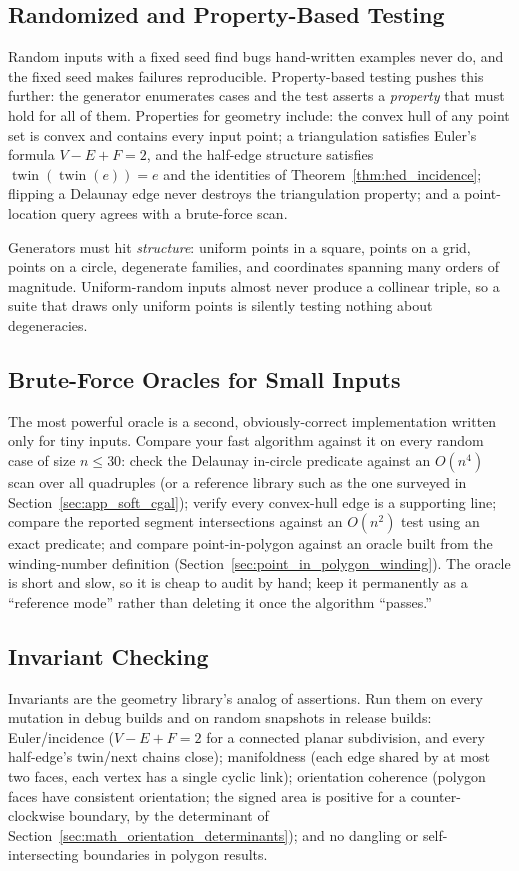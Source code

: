 \subsection{Randomized and Property-Based Testing}
\label{sec:appimpl_randomized}
Random inputs with a fixed seed find bugs
hand-written examples never do, and the fixed seed makes failures
reproducible. Property-based testing pushes
this further: the generator enumerates cases and the test asserts a
\emph{property} that must hold for all of them. Properties for geometry
include: the convex hull of any point set is convex and contains every input
point; a triangulation satisfies Euler's formula $V-E+F=2$, and the
half-edge structure satisfies $\operatorname{twin}(\operatorname{twin}(e))
= e$ and the identities of Theorem~\ref{thm:hed_incidence}; flipping a
Delaunay edge never destroys the triangulation property; and a point-location
query agrees with a brute-force scan.

Generators must hit \emph{structure}: uniform points in a square, points on
a grid, points on a circle, degenerate families, and coordinates spanning
many orders of magnitude. Uniform-random inputs almost never produce a
collinear triple, so a suite that draws only uniform points is silently
testing nothing about degeneracies.
\subsection{Brute-Force Oracles for Small Inputs}
\label{sec:appimpl_bruteforce}
The most powerful oracle is a second, obviously-correct implementation
written only for tiny inputs. Compare your fast algorithm against it on
every random case of size $n \le 30$: check the Delaunay in-circle
predicate against an $O(n^4)$ scan over all quadruples (or a reference
library such as the one surveyed in Section~\ref{sec:app_soft_cgal});
verify every convex-hull edge is a supporting line; compare the reported
segment intersections against an $O(n^2)$ test using an exact predicate;
and compare point-in-polygon against an oracle built from the
winding-number definition (Section~\ref{sec:point_in_polygon_winding}). The
oracle is short and slow, so it is cheap to audit by hand; keep it
permanently as a ``reference mode'' rather than deleting it once the
algorithm ``passes.''
\subsection{Invariant Checking}
\label{sec:appimpl_invariant}
Invariants are the geometry library's analog of
assertions. Run them on every mutation in debug builds and on random
snapshots in release builds: Euler/incidence
($V-E+F=2$ for a connected planar subdivision, and every half-edge's
twin/next chains close); manifoldness (each edge shared by at most two
faces, each vertex has a single cyclic link); orientation coherence
(polygon faces have consistent orientation; the signed area is positive for
a counter-clockwise boundary, by the determinant of
Section~\ref{sec:math_orientation_determinants}); and no dangling or
self-intersecting boundaries in polygon results.

